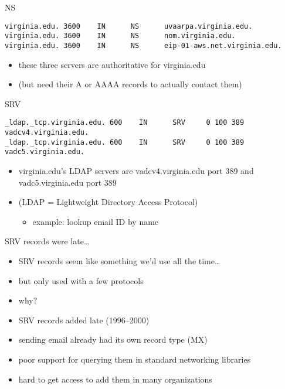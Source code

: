 \begin{frame}[fragile]{NS}
\begin{Verbatim}[fontsize=\small]
virginia.edu. 3600    IN      NS      uvaarpa.virginia.edu.
virginia.edu. 3600    IN      NS      nom.virginia.edu.
virginia.edu. 3600    IN      NS      eip-01-aws.net.virginia.edu.
\end{Verbatim}
\begin{itemize}
\item these three servers are authoritative for virginia.edu
\item (but need their A or AAAA records to actually contact them)
\end{itemize}
\end{frame}

\begin{frame}[fragile]{SRV}
\begin{Verbatim}[fontsize=\small]
_ldap._tcp.virginia.edu. 600    IN      SRV     0 100 389 vadcv4.virginia.edu.
_ldap._tcp.virginia.edu. 600    IN      SRV     0 100 389 vadc5.virginia.edu.
\end{Verbatim}
\begin{itemize}
\item virginia.edu's LDAP servers are vadcv4.virginia.edu port 389 and vadc5.virginia.edu port 389
\item (LDAP = Lightweight Directory Access Protocol)
    \begin{itemize}
    \item example: lookup email ID by name
    \end{itemize}
\end{itemize}
\end{frame}

\begin{frame}{SRV records were late\ldots}
\begin{itemize}
\item SRV records seem like something we'd use all the time\ldots
\item but only used with a few protocols
\item why?
\vspace{.5cm}
\item SRV records added late (1996--2000)
\item sending email already had its own record type (MX)
\item poor support for querying them in standard networking libraries
\item hard to get access to add them in many organizations
\end{itemize}
\end{frame}

